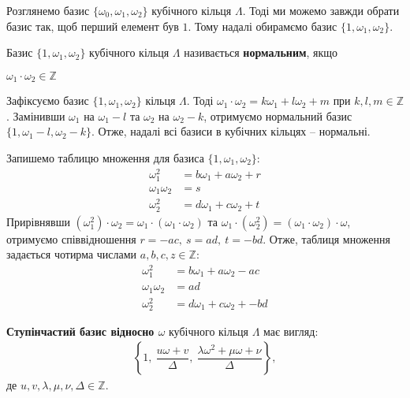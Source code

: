 \documentclass{thesis}
\begin{document}
\begin{remark}
Розглянемо базис $\{\omega_0,\omega_1,\omega_2\}$ кубічного кільця $\Lambda$. Тоді ми можемо завжди обрати базис так, щоб перший елемент був $1$. Тому надалі обирамємо базис $\{1,\omega_1,\omega_2\}$.
\end{remark}

\begin{definition}
Базис $\{1,\omega_1,\omega_2\}$ кубічного кільця $\Lambda$ називається \textbf{нормальним}, якщо
\begin{center}
$\omega_1 \cdot \omega_2 \in \mathbb{Z}$
\end{center}
\end{definition}

\begin{remark}
Зафіксуємо базис $\{1,\omega_1,\omega_2\}$ кільця $\Lambda$. Тоді $\omega_1 \cdot \omega_2 = k \omega_1 + l \omega_2 + m$ при $k,l,m \in \mathbb{Z}$. Замінивши $\omega_1$ на $\omega_1-l$ та $\omega_2$ на $\omega_2 - k$, отримуємо нормальний базис $\{1,\omega_1 - l, \omega_2 - k\}$. Отже, надалі всі базиси в кубічних кільцях -- нормальні.
\end{remark}

Запишемо таблицю множення для базиса $\{1,\omega_1,\omega_2\}$:
\begin{align*}
\omega_1^2 & = b \omega_1 + a \omega_2 + r \\
\omega_1 \omega_2 & = s \\
\omega_2^2 & = d \omega_1 + c \omega_2 + t
\end{align*}
Прирівнявши $(\omega_1^2) \cdot \omega_2 = \omega_1 \cdot (\omega_1 \cdot \omega_2)$ та $\omega_1 \cdot (\omega_2^2) = (\omega_1 \cdot \omega_2) \cdot \omega$, отримуємо співвідношення $r = -ac,\ s = ad,\ t = -bd$. Отже, таблиця множення задається чотирма числами $a,b,c,z \in \mathbb{Z}$:
\begin{align*}
\omega_1^2 & = b \omega_1 + a \omega_2 - ac \\
\omega_1 \omega_2 & = ad \\
\omega_2^2 & = d \omega_1 + c \omega_2 + -bd
\end{align*}

\begin{definition}
\textbf{Ступінчастий базис відносно $\omega$} кубічного кільця $\Lambda$ має вигляд:
\begin{align*}
\left\{ 1,\ \dfrac{u\omega + v}{\Delta},\ \dfrac{\lambda \omega^2 + \mu \omega + \nu}{\Delta} \right\},
\end{align*}
де $u,v,\lambda,\mu,\nu,\Delta \in \mathbb{Z}$.
\end{definition}
\end{document}
